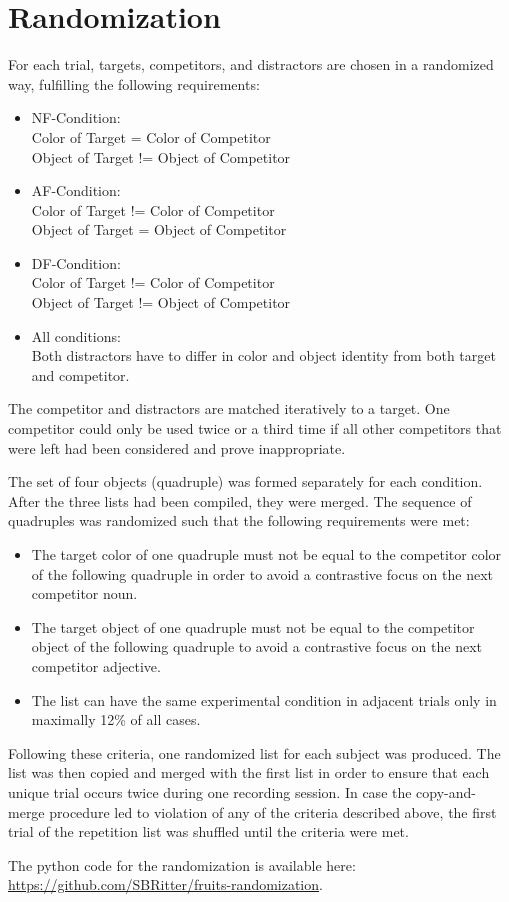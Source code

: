 \documentclass[
]{article}
\providecommand{\tightlist}{%
  \setlength{\itemsep}{0pt}\setlength{\parskip}{0pt}}
\begin{document}
\hypertarget{randomization}{%
\section{Randomization}\label{randomization}}

For each trial, targets, competitors, and distractors are chosen in a
randomized way, fulfilling the following requirements:

\begin{itemize}
\item
  NF-Condition:\\
  Color of Target = Color of Competitor\\
  Object of Target != Object of Competitor
\item
  AF-Condition:\\
  Color of Target != Color of Competitor\\
  Object of Target = Object of Competitor
\item
  DF-Condition:\\
  Color of Target != Color of Competitor\\
  Object of Target != Object of Competitor
\item
  All conditions:\\
  Both distractors have to differ in color and object identity from both
  target and competitor.
\end{itemize}

The competitor and distractors are matched iteratively to a target. One
competitor could only be used twice or a third time if all other
competitors that were left had been considered and prove inappropriate.

The set of four objects (quadruple) was formed separately for each
condition. After the three lists had been compiled, they were merged.
The sequence of quadruples was randomized such that the following
requirements were met:

\begin{itemize}
\tightlist
\item
  The target color of one quadruple must not be equal to the competitor
  color of the following quadruple in order to avoid a contrastive focus
  on the next competitor noun.
\item
  The target object of one quadruple must not be equal to the competitor
  object of the following quadruple to avoid a contrastive focus on the
  next competitor adjective.
\item
  The list can have the same experimental condition in adjacent trials
  only in maximally 12\% of all cases.
\end{itemize}

Following these criteria, one randomized list for each subject was
produced. The list was then copied and merged with the first list in
order to ensure that each unique trial occurs twice during one recording
session. In case the copy-and-merge procedure led to violation of any of
the criteria described above, the first trial of the repetition list was
shuffled until the criteria were met.

The python code for the randomization is available here:
\url{https://github.com/SBRitter/fruits-randomization}.
\end{document}

